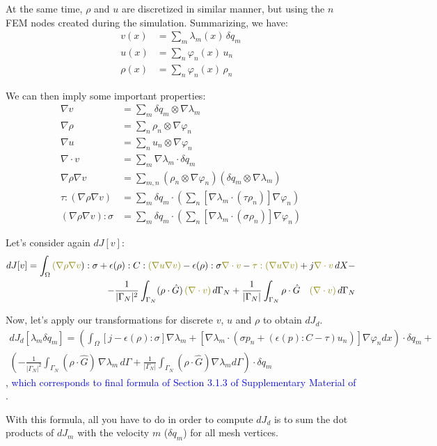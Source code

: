 \documentclass[11pt]{article}
\newcommand{\blue}{\textcolor{blue}}
\newcommand{\olive}{\textcolor{olive}}
\begin{document}
At the same time, $\rho$ and $u$ are discretized in similar manner, but using the $n$ FEM nodes created during the simulation. Summarizing, we have:
\begin{align*}
    v(x) &= \sum_m \lambda_m(x) \, \delta q_m\\
    u(x) &= \sum_n \varphi_n(x) \, u_n\\
    \rho(x) &= \sum_n \varphi_n(x) \, \rho_n
\end{align*}

We can then imply some important properties:
\begin{align*}
    \nabla v &= \sum_m   \delta q_m \otimes \nabla \lambda_m\\
    \nabla \rho &= \sum_n   \rho_n \otimes \nabla \varphi_n\\
    \nabla u &= \sum_n   u_n \otimes \nabla \varphi_n\\
    \nabla \cdot v &= \sum_m   \nabla \lambda_m \cdot \delta q_m\\    
    \nabla \rho \nabla v &= \sum_{m,n} (\rho_n \otimes \nabla \varphi_n)(\delta q_m \otimes \nabla \lambda_m)\\
    \tau:(\nabla \rho \nabla v) &= \sum_m \delta q_m \cdot (\sum_n \left[ \nabla \lambda_m \cdot (\tau \rho_n) \right] \nabla \varphi_n)\\
    (\nabla \rho \nabla v):\sigma &= \sum_m \delta q_m \cdot (\sum_n \left[ \nabla \lambda_m \cdot (\sigma \rho_n) \right] \nabla \varphi_n)
\end{align*}

Let's consider again $dJ[v]$:
\begin{align*}
  dJ[v] = \int_{\Omega} \olive{(\nabla \rho \nabla v}):\sigma + \epsilon(\rho):C:\olive{(\nabla u \nabla v)} - \epsilon(\rho): \sigma \olive{\nabla \cdot v}  - \olive{\tau : (\nabla u \nabla v)} + j \olive{\nabla \cdot v} \, dX - \\ - \frac{1}{|\Gamma_{N}|^2} \int_{\Gamma_{N}} (\rho \cdot \hat G)\, \olive{(\nabla \cdot v)}\,d\Gamma_{N}  + \frac{1}{|\Gamma_N|}\int_{\Gamma_{N}} \rho \cdot \hat G \quad \olive{(\nabla \cdot v)}\, d\Gamma_{N}
\end{align*}

Now, let's apply our transformations for discrete $v$, $u$ and $\rho$ to obtain $dJ_d$.
\begin{multline}
  \boxed{dJ_d[\lambda_m \delta q_m] = \left( \int_\Omega \left[ j - \epsilon(\rho):\sigma \right] \nabla \lambda_m + \left[ \nabla \lambda_m \cdot (\sigma p_n + (\epsilon(p):C-\tau)u_n) \right] \nabla \varphi_n dx\right)\cdot \delta q_m +} \\ \boxed{\left( - \frac{1}{|\Gamma_{N}|^2} \int_{\Gamma_{N}} (\rho \cdot \hat G)\, \nabla \lambda_m\,d\Gamma + \frac{1}{|\Gamma_N|}\int_{\Gamma_N} (\rho \cdot \hat G) \nabla \lambda_m d\Gamma \right) \cdot \delta q_m}
\end{multline}
, \blue{which corresponds to final formula of Section 3.1.3 of Supplementary Material of \cite{panetta2017}}.

With this formula, all you have to do in order to compute $dJ_d$ is to sum the dot products of $dJ_m$ with the velocity $m$ ($\delta q_m$) for all mesh vertices.



 
\end{document}
